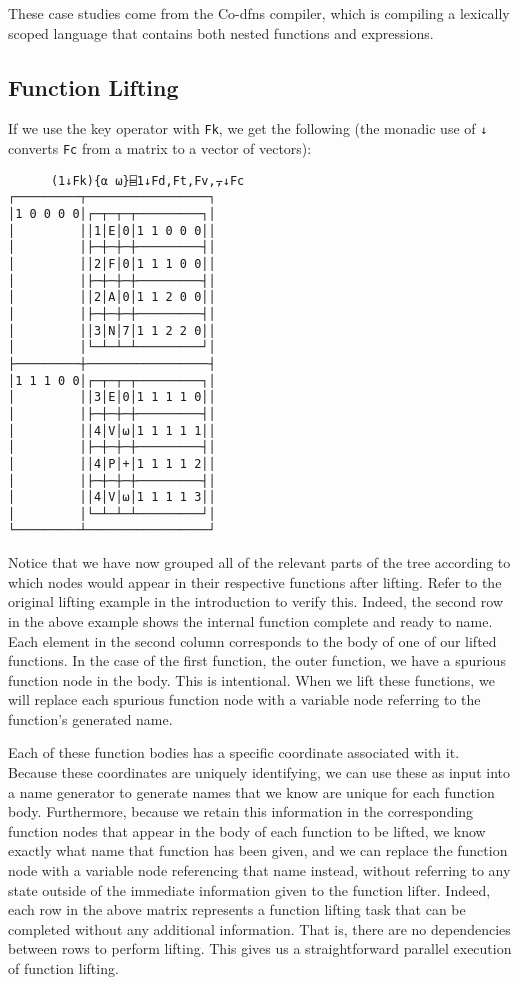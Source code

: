 \documentclass[numbers,preprint]{sigplanconf}
\begin{document}
These case studies come from the Co-dfns compiler, which is compiling a 
lexically scoped language that contains both nested functions and 
expressions. 

\subsection{Function Lifting}

If we use the key operator with \verb;Fk;, we get the following (the monadic
use of \verb;↓; converts \verb;Fc; from a matrix to a vector of vectors):

\begin{verbatim}
      (1↓Fk){⍺ ⍵}⌸1↓Fd,Ft,Fv,⍪↓Fc
┌─────────┬─────────────────┐
│1 0 0 0 0│┌─┬─┬─┬─────────┐│
│         ││1│E│0│1 1 0 0 0││
│         │├─┼─┼─┼─────────┤│
│         ││2│F│0│1 1 1 0 0││
│         │├─┼─┼─┼─────────┤│
│         ││2│A│0│1 1 2 0 0││
│         │├─┼─┼─┼─────────┤│
│         ││3│N│7│1 1 2 2 0││
│         │└─┴─┴─┴─────────┘│
├─────────┼─────────────────┤
│1 1 1 0 0│┌─┬─┬─┬─────────┐│
│         ││3│E│0│1 1 1 1 0││
│         │├─┼─┼─┼─────────┤│
│         ││4│V│⍵│1 1 1 1 1││
│         │├─┼─┼─┼─────────┤│
│         ││4│P│+│1 1 1 1 2││
│         │├─┼─┼─┼─────────┤│
│         ││4│V│⍵│1 1 1 1 3││
│         │└─┴─┴─┴─────────┘│
└─────────┴─────────────────┘
\end{verbatim}

Notice that we have now grouped all of the relevant parts of the
tree according to which nodes would appear in their respective
functions after lifting. Refer to the original lifting example in
the introduction to verify this. Indeed, the second row in the
above example shows the internal function complete and ready to
name. Each element in the second column corresponds to the body of
one of our lifted functions. In the case of the first function, the
outer function, we have a spurious function node in the body. This
is intentional. When we lift these functions, we will replace
each spurious function node with a variable node referring to the
function’s generated name.

Each of these function bodies has a specific coordinate associated
with it. Because these coordinates are uniquely identifying, we can
use these as input into a name generator to generate names that we
know are unique for each function body. Furthermore, because we
retain this information in the corresponding function nodes that
appear in the body of each function to be lifted, we know exactly
what name that function has been given, and we can replace the
function node with a variable node referencing that name instead,
without referring to any state outside of the immediate information
given to the function lifter. Indeed, each row in the above matrix
represents a function lifting task that can be completed without any
additional information. That is, there are no dependencies between
rows to perform lifting. This gives us a straightforward parallel
execution of function lifting.
\end{document}
